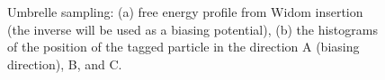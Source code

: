 \begin{figure}[t]
  \centering
  \caption{Umbrelle sampling: (a) free energy profile from Widom insertion (the inverse will be used as a biasing potential),
           (b) the histograms of the position of the tagged particle in the direction A (biasing direction), B, and C.}
  \label{Fig: umbrealla sampling}
\end{figure}

